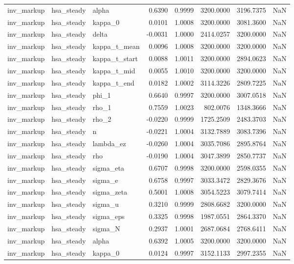 \begin{tabular}{lllrrrrl}
inv\_markup & hsa\_steady & alpha & 0.6390 & 0.9999 & 3200.0000 & 3196.7375 & NaN \\
inv\_markup & hsa\_steady & kappa\_0 & 0.0101 & 1.0008 & 3200.0000 & 3081.3600 & NaN \\
inv\_markup & hsa\_steady & delta & -0.0031 & 1.0000 & 2414.0257 & 3200.0000 & NaN \\
inv\_markup & hsa\_steady & kappa\_t\_mean & 0.0096 & 1.0008 & 3200.0000 & 3200.0000 & NaN \\
inv\_markup & hsa\_steady & kappa\_t\_start & 0.0088 & 1.0011 & 3200.0000 & 2894.0623 & NaN \\
inv\_markup & hsa\_steady & kappa\_t\_mid & 0.0055 & 1.0010 & 3200.0000 & 3200.0000 & NaN \\
inv\_markup & hsa\_steady & kappa\_t\_end & 0.0182 & 1.0002 & 3114.3226 & 2809.7225 & NaN \\
inv\_markup & hsa\_steady & phi\_1 & 0.6640 & 0.9997 & 3200.0000 & 3007.0518 & NaN \\
inv\_markup & hsa\_steady & rho\_1 & 0.7559 & 1.0023 & 802.0076 & 1348.3666 & NaN \\
inv\_markup & hsa\_steady & rho\_2 & -0.0220 & 0.9999 & 1725.2509 & 2483.3703 & NaN \\
inv\_markup & hsa\_steady & n & -0.0221 & 1.0004 & 3132.7889 & 3083.7396 & NaN \\
inv\_markup & hsa\_steady & lambda\_ez & -0.0260 & 1.0004 & 3035.7086 & 2895.8764 & NaN \\
inv\_markup & hsa\_steady & rho & -0.0190 & 1.0004 & 3047.3899 & 2850.7737 & NaN \\
inv\_markup & hsa\_steady & sigma\_eta & 0.6707 & 0.9998 & 3200.0000 & 2598.0355 & NaN \\
inv\_markup & hsa\_steady & sigma\_e & 0.6758 & 0.9997 & 3033.3472 & 2829.3676 & NaN \\
inv\_markup & hsa\_steady & sigma\_zeta & 0.5001 & 1.0008 & 3054.5223 & 3079.7414 & NaN \\
inv\_markup & hsa\_steady & sigma\_u & 0.3210 & 0.9999 & 2808.6682 & 3200.0000 & NaN \\
inv\_markup & hsa\_steady & sigma\_eps & 0.3325 & 0.9998 & 1987.0551 & 2864.3370 & NaN \\
inv\_markup & hsa\_steady & sigma\_N & 0.2937 & 1.0001 & 2687.0684 & 2768.6411 & NaN \\
inv\_markup & hsa\_steady & alpha & 0.6392 & 1.0005 & 3200.0000 & 3200.0000 & NaN \\
inv\_markup & hsa\_steady & kappa\_0 & 0.0124 & 0.9997 & 3152.1133 & 2997.2355 & NaN \\

\end{tabular}
